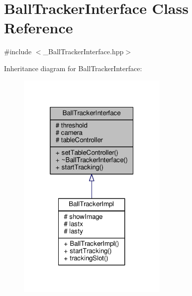 \hypertarget{class_ball_tracker_interface}{}\section{Ball\+Tracker\+Interface Class Reference}
\label{class_ball_tracker_interface}


{\ttfamily \#include $<$\+\_\+\+Ball\+Tracker\+Interface.\+hpp$>$}



Inheritance diagram for Ball\+Tracker\+Interface\+:\nopagebreak
\begin{figure}[H]
\begin{center}
\leavevmode
\includegraphics[width=205pt]{class_ball_tracker_interface__inherit__graph}
\end{center}
\end{figure}


